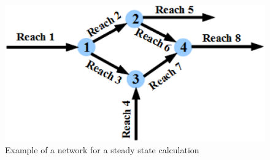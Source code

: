 \begin{figure}
 \begin{center}
  \includegraphics[scale=0.25,angle=0]{Figures/Ex_Res_SARAP.eps}
  \caption{Example of a network for a steady state calculation}
  \label{ExSP}
 \end{center}
\end{figure}

\newpage

